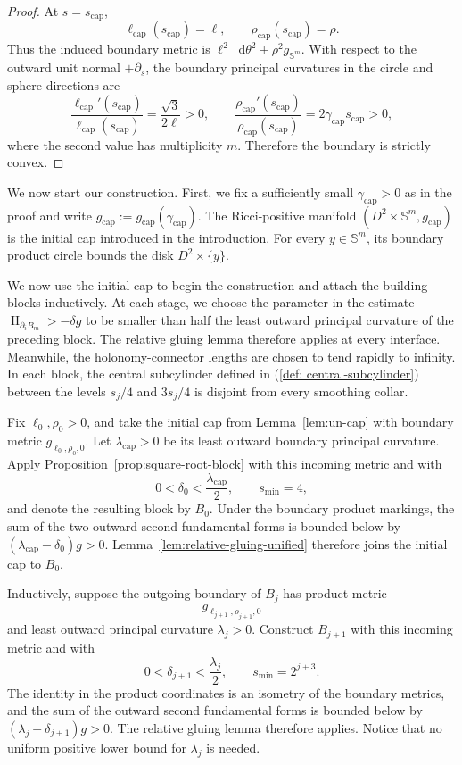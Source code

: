 \documentclass[11pt,reqno]{amsart}
\theoremstyle{definition}
\numberwithin{equation}{section}
\DeclareMathOperator{\II}{II}
\newcommand{\dd}{\mathop{}\!\mathrm d}
\begin{document}
\begin{proof}
At \(s=s_{\mathrm{cap}}\),
\[
 \ell_{\mathrm{cap}}(s_{\mathrm{cap}})=\ell,
 \qquad
 \rho_{\mathrm{cap}}(s_{\mathrm{cap}})=\rho.
\]
Thus the induced boundary metric is
\(\ell^2\dd\theta^2+\rho^2g_{\mathbb S^m}\).  With respect to the
outward unit normal \(+\partial_s\), the boundary principal curvatures
in the circle and sphere directions are
\[
 \frac{\ell_{\mathrm{cap}}'(s_{\mathrm{cap}})}
      {\ell_{\mathrm{cap}}(s_{\mathrm{cap}})}
 =\frac{\sqrt3}{2\ell}>0,
 \qquad
 \frac{\rho_{\mathrm{cap}}'(s_{\mathrm{cap}})}
      {\rho_{\mathrm{cap}}(s_{\mathrm{cap}})}
 =2\gamma_{\mathrm{cap}}s_{\mathrm{cap}}>0,
\]
where the second value has multiplicity \(m\).  Therefore the boundary
is strictly convex.
\end{proof}

We now start our construction. First,
we fix a sufficiently small $\gamma_{\mathrm{cap}}>0$ as in the proof and
write $g_{\mathrm{cap}}:=g_{\mathrm{cap}}(\gamma_{\mathrm{cap}})$.  The
Ricci-positive manifold
$(D^2\times\mathbb S^m,g_{\mathrm{cap}})$ is the initial cap introduced
in the introduction.  For every $y\in\mathbb S^m$, its boundary product
circle bounds the disk $D^2\times\{y\}$.

We now use the initial cap to begin the construction and attach the building
blocks inductively.  At each stage, we choose the parameter in the
estimate \(\II_{\partial_iB_m}>-\delta g\) to be smaller than half the
least outward principal curvature of the preceding block.  The relative
gluing lemma therefore applies at every interface.
Meanwhile, the holonomy-connector lengths are chosen to tend rapidly to
infinity.  In each block, the central subcylinder defined in (\ref{def: central-subcylinder}) between the levels
$s_j/4$ and $3s_j/4$ is disjoint from every smoothing collar.

Fix \(\ell_0,\rho_0>0\), and take the initial cap from
Lemma~\ref{lem:un-cap} with boundary metric \(g_{\ell_0,\rho_0,0}\).
Let \(\lambda_{\mathrm{cap}}>0\) be its least outward boundary principal
curvature.  Apply Proposition~\ref{prop:square-root-block} with this
incoming metric and with
\[
 0<\delta_0<\frac{\lambda_{\mathrm{cap}}}{2},
 \qquad s_{\min}=4,
\]
and denote the resulting block by \(B_0\).  Under the boundary product
markings, the sum of the two outward second fundamental forms is
bounded below by
\((\lambda_{\mathrm{cap}}-\delta_0)g>0\).
Lemma~\ref{lem:relative-gluing-unified} therefore joins the initial cap to
\(B_0\).

Inductively, suppose the outgoing boundary of \(B_j\) has product metric
\[
 g_{\ell_{j+1},\rho_{j+1},0}
\]
and least outward principal curvature \(\lambda_j>0\).  Construct
\(B_{j+1}\) with this incoming metric and with
\[
 0<\delta_{j+1}<\frac{\lambda_j}{2},
 \qquad s_{\min}=2^{j+3}.
\]
The identity in the product coordinates is an isometry of the boundary
metrics, and the sum of the outward second fundamental forms is bounded
below by \((\lambda_j-\delta_{j+1})g>0\).  The relative gluing lemma
therefore applies.  Notice that no uniform positive lower bound for
\(\lambda_j\) is needed.
\end{document}
